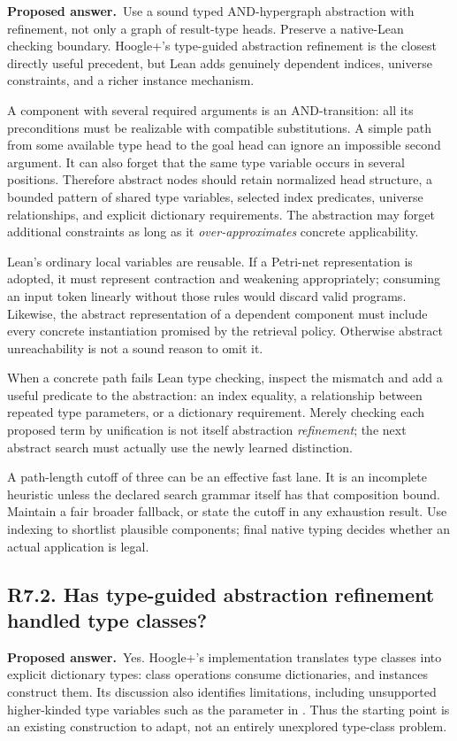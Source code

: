 \documentclass[11pt,a4paper]{article}
\newcommand{\code}[1]{\texttt{\small\detokenize{#1}}}
\newcommand{\question}[2]{\subsection{#1. #2}\label{q:#1}}
\newcommand{\answer}{\textbf{Proposed answer.}\ }
\theoremstyle{remark}
\begin{document}
\answer Use a sound typed AND-hypergraph abstraction with refinement, not only
a graph of result-type heads. Preserve a native-Lean checking boundary.
Hoogle+'s type-guided abstraction refinement is the closest directly useful
precedent, but Lean adds genuinely dependent indices, universe constraints,
and a richer instance mechanism.\cite{tygar}

A component with several required arguments is an AND-transition: all its
preconditions must be realizable with compatible substitutions. A simple
path from some available type head to the goal head can ignore an impossible
second argument. It can also forget that the same type variable occurs in
several positions. Therefore abstract nodes should retain normalized head
structure, a bounded pattern of shared type variables, selected index
predicates, universe relationships, and explicit dictionary requirements.
The abstraction may forget additional constraints as long as it
\emph{over-approximates} concrete applicability.

Lean's ordinary local variables are reusable. If a Petri-net representation
is adopted, it must represent contraction and weakening appropriately;
consuming an input token linearly without those rules would discard valid
programs. Likewise, the abstract representation of a dependent component
must include every concrete instantiation promised by the retrieval policy.
Otherwise abstract unreachability is not a sound reason to omit it.

When a concrete path fails Lean type checking, inspect the mismatch and add
a useful predicate to the abstraction: an index equality, a relationship
between repeated type parameters, or a dictionary requirement. Merely
checking each proposed term by unification is not itself abstraction
\emph{refinement}; the next abstract search must actually use the newly
learned distinction.

A path-length cutoff of three can be an effective fast lane. It is an
incomplete heuristic unless the declared search grammar itself has that
composition bound. Maintain a fair broader fallback, or state the cutoff in
any exhaustion result. Use indexing to shortlist plausible components;
final native typing decides whether an actual application is legal.

\question{R7.2}{Has type-guided abstraction refinement handled type classes?}

\answer Yes. Hoogle+'s implementation translates type classes into explicit
dictionary types: class operations consume dictionaries, and instances
construct them. Its discussion also identifies limitations, including
unsupported higher-kinded type variables such as the parameter in
\code{Monad m}. Thus the starting point is an existing construction to adapt,
not an entirely unexplored type-class problem.\cite{tygar}
\end{document}
